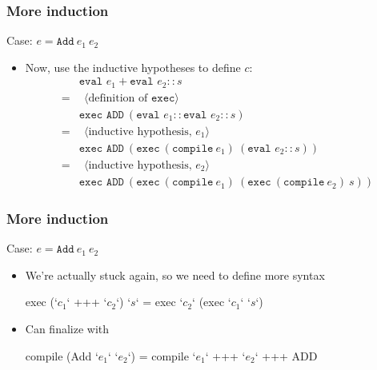 \documentclass[usenames,dvipsnames]{beamer}
\begin{document}
\begin{frame}[fragile]
  \frametitle{More induction}
  \begin{totop}
    Case: $e = \texttt{Add}\ e_1\ e_2$
  \end{totop}

  \begin{itemize}
    \item Now, use the inductive hypotheses to define $c$:
      \begin{align*}
          &\texttt{eval }e_1+\texttt{eval }e_2 :: s \\
        = &\ \ \langle \text{definition of }\texttt{exec} \rangle \\
          &\texttt{exec ADD}\ (\texttt{eval }e_1 :: \texttt{eval }e_2 :: s) \\
        = &\ \ \langle \text{inductive hypothesis, $e_1$} \rangle \\
          &\texttt{exec ADD}\ (
            \texttt{exec}\ (\texttt{compile}\ e_1)\ (\texttt{eval }e_2 :: s))
            \\
        = &\ \ \langle \text{inductive hypothesis, $e_2$} \rangle \\
          &\texttt{exec ADD}\ (
            \texttt{exec}\ (\texttt{compile}\ e_1)\ (
              \texttt{exec}\ (\texttt{compile}\ e_2)\ s))
      \end{align*}
  \end{itemize}
\end{frame}


\begin{frame}[fragile]
  \frametitle{More induction}
  \begin{totop}
    Case: $e = \texttt{Add}\ e_1\ e_2$
  \end{totop}

  \begin{itemize}
    \item We're actually stuck again, so we need to define more syntax

      \begin{code}
        exec (`$c_1$` +++ `$c_2$`) `$s$` = exec `$c_2$` (exec `$c_1$` `$s$`)
      \end{code}

    \item Can finalize with

      \begin{code}
        compile (Add `$e_1$` `$e_2$`) = compile `$e_1$` +++ `$e_2$` +++ ADD
      \end{code}
  \end{itemize}
\end{frame}
\end{document}
